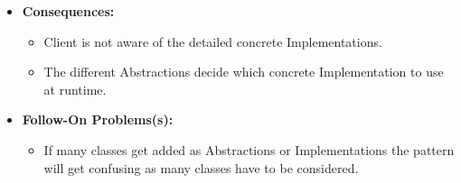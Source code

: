 \documentclass[a4paper, 10pt]{article}
\begin{document}
\begin{enumerate}
\begin{itemize}
        \item \textbf{Consequences:} \begin{itemize}
            \item Client is not aware of the detailed concrete Implementations.
            \item The different Abstractions decide which concrete Implementation to use at runtime.
        \end{itemize}
        \item \textbf{Follow-On Problems(s):} \begin{itemize}
            \item If many classes get added as Abstractions or Implementations the pattern will get confusing as many classes have to be considered.
        \end{itemize}
    \end{itemize}
\end{enumerate}
\end{document}
